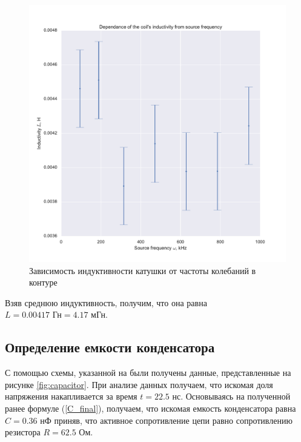 \documentclass[a4paper, 12pt]{article}
\begin{document}
\begin{figure}[h!]
	\centering
	\includegraphics[width=\textwidth]{Inductivity.pdf}
	\caption{Зависимость индуктивности катушки от частоты колебаний в контуре}
	\label{fig:inductivity}
\end{figure}

Взяв среднюю индуктивность, получим, что она равна $\boxed{L = 0.00417 \text{ Гн} = 4.17 \text{ мГн}}$.

\subsection{Определение емкости конденсатора}

С помощью схемы, указанной на %
были получены данные, представленные на рисунке \ref{fig:capacitor}. При анализе данных получаем, что искомая доля напряжения накапливается за время $\boxed{t = 22.5\text{ нс}}$. Основываясь на полученной ранее формуле (\ref{C_final}), получаем, что искомая емкость конденсатора равна $\boxed{C = 0.36\text{ нФ}}$ приняв, что активное сопротивление цепи равно сопротивлению резистора $R = 62.5$ Ом.
\end{document}
